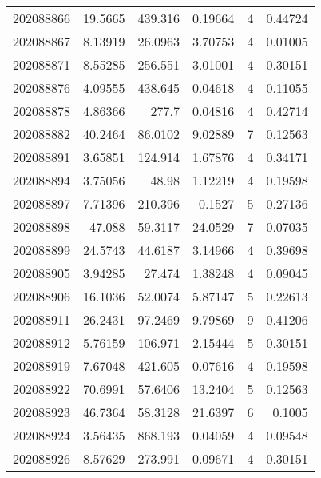 \begin{tabular}{rrrrrr}
 202088866 &         19.5665  &      439.316  &            0.19664 &           4 & 0.44724 \\
 202088867 &          8.13919 &       26.0963 &            3.70753 &           4 & 0.01005 \\
 202088871 &          8.55285 &      256.551  &            3.01001 &           4 & 0.30151 \\
 202088876 &          4.09555 &      438.645  &            0.04618 &           4 & 0.11055 \\
 202088878 &          4.86366 &      277.7    &            0.04816 &           4 & 0.42714 \\
 202088882 &         40.2464  &       86.0102 &            9.02889 &           7 & 0.12563 \\
 202088891 &          3.65851 &      124.914  &            1.67876 &           4 & 0.34171 \\
 202088894 &          3.75056 &       48.98   &            1.12219 &           4 & 0.19598 \\
 202088897 &          7.71396 &      210.396  &            0.1527  &           5 & 0.27136 \\
 202088898 &         47.088   &       59.3117 &           24.0529  &           7 & 0.07035 \\
 202088899 &         24.5743  &       44.6187 &            3.14966 &           4 & 0.39698 \\
 202088905 &          3.94285 &       27.474  &            1.38248 &           4 & 0.09045 \\
 202088906 &         16.1036  &       52.0074 &            5.87147 &           5 & 0.22613 \\
 202088911 &         26.2431  &       97.2469 &            9.79869 &           9 & 0.41206 \\
 202088912 &          5.76159 &      106.971  &            2.15444 &           5 & 0.30151 \\
 202088919 &          7.67048 &      421.605  &            0.07616 &           4 & 0.19598 \\
 202088922 &         70.6991  &       57.6406 &           13.2404  &           5 & 0.12563 \\
 202088923 &         46.7364  &       58.3128 &           21.6397  &           6 & 0.1005  \\
 202088924 &          3.56435 &      868.193  &            0.04059 &           4 & 0.09548 \\
 202088926 &          8.57629 &      273.991  &            0.09671 &           4 & 0.30151 \\

\end{tabular}
